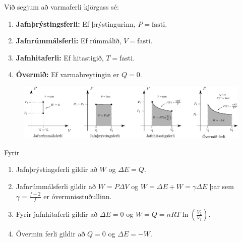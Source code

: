 \ifdefined \wholebook \else\documentclass[oneside]{book}\usepackage{EdlBook}\graphicspath{{figures/}}
\begin{document}
\begin{tcolorbox}
\begin{definition}
Við segjum að varmaferli kjörgass sé:
\begin{enumerate}[label =\textbf{ (\roman*)}]
    \item \textbf{Jafnþrýstingsferli:} Ef þrýstingurinn, $P = \text{fasti}$.
    \item \textbf{Jafnrúmmálsferli:} Ef rúmmálið, $V = \text{fasti}$.
    \item \textbf{Jafnhitaferli:} Ef hitastigið, $T = \text{fasti}$.
    \item \textbf{Óvermið:} Ef varmabreytingin er $Q = 0$.
\end{enumerate}
\end{definition}

\begin{figure}[H]
    \centering
    \includegraphics[width = \textwidth]{figures/varmaferlin.pdf}
\end{figure}
\end{tcolorbox}


\begin{tcolorbox}
\begin{theorem} Fyrir
\begin{enumerate}[label =\textbf{ (\roman*)}]
    \item Jafnþrýstingsferli gildir að $W$ og $\Delta E = Q$.
    \item Jafnrúmmálsferli gildir að $W = P \Delta V$ og $W = \Delta E + W = \gamma \Delta E$ þar sem $\gamma = \frac{f+2}{f}$ er óvermnisstuðullinn.
    \item Fyrir jafnhitaferli gildir að $\Delta E = 0$ og $W = Q = nRT\ln(\frac{V_2}{V_1})$.
    \item Óvermin ferli gildir að $Q = 0$ og $\Delta E = -W$.
\end{enumerate}
\end{theorem}
\end{tcolorbox}
\end{document}
